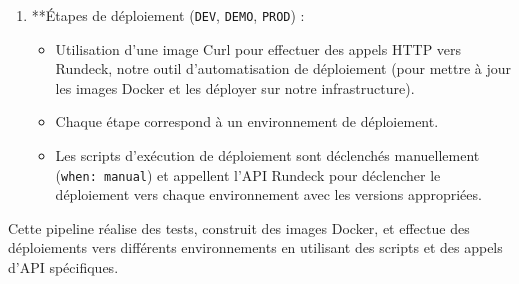 \documentclass[a4paper, 11pt]{report}
\begin{document}
\begin{enumerate}
\begin{itemize}
  \end{itemize}
\item
  **Étapes de déploiement (\texttt{DEV}, \texttt{DEMO}, \texttt{PROD}) :
  \begin{itemize}
  \tightlist
  \item
    Utilisation d'une image Curl pour effectuer des appels HTTP vers
    Rundeck, notre outil d'automatisation de déploiement (pour mettre à
    jour les images Docker et les déployer sur notre infrastructure).
  \item
    Chaque étape correspond à un environnement de déploiement.
  \item
    Les scripts d'exécution de déploiement sont déclenchés manuellement
    (\texttt{when:\ manual}) et appellent l'API Rundeck pour déclencher
    le déploiement vers chaque environnement avec les versions
    appropriées.
  \end{itemize}
\end{enumerate}
Cette pipeline réalise des tests, construit des images Docker, et
effectue des déploiements vers différents environnements en utilisant
des scripts et des appels d'API spécifiques.
\end{document}
